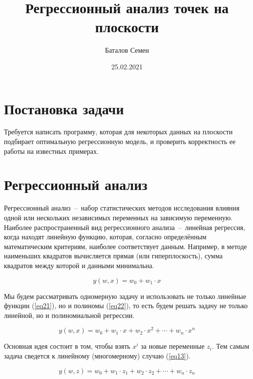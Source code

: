 \documentclass[12pt, a4paper]{article}
\title{Регрессионный анализ точек на плоскости}
\author{Баталов Семен}
\date{25.02.2021}
\begin{document}
    
    \sloppy
    
    \maketitle
    
    \section{Постановка задачи}
    
    Требуется написать программу, которая для некоторых данных на плоскости 
    подбирает оптимальную регрессионную модель, и проверить корректность ее 
    работы на известных примерах.
    
    \section{Регрессионный анализ}
    
    Регрессионный анализ~--~набор статистических методов исследования 
    влияния одной или нескольких независимых переменных на зависимую 
    переменную. Наиболее распространенный вид регрессионного 
    анализа~--~линейная регрессия, когда находят линейную функцию, которая, 
    согласно определённым математическим критериям, наиболее соответствует 
    данным. Например, в методе наименьших квадратов вычисляется прямая (или 
    гиперплоскость), сумма квадратов между которой и данными минимальна.
    
    \begin{equation}
        y(w, x) = w_{0} + w_{1} \cdot x
        \label{eq21}
    \end{equation}
    
    Мы будем рассматривать одномерную задачу и использовать не только 
    линейные функции (\ref{eq21}), но и полиномы (\ref{eq22}), то есть будем 
    решать задачу не только линейной, но и полиномиальной регрессии.
    
    \begin{equation}
        y(w, x) = w_{0} + w_{1} \cdot x + w_{2} \cdot x^{2} + \cdots + w_{n} 
        \cdot x^{n}
        \label{eq22}
    \end{equation}
    
    Основная идея состоит в том, чтобы взять $x^{i}$ за новые переменные 
    $z_{i}$. Тем самым задача сведется к линейному (многомерному) случаю 
    (\ref{eq13}).
    
    \begin{equation}
        y(w, z) = w_{0} + w_{1} \cdot z_{1} + w_{2} \cdot z_{2} + \cdots + 
        w_{n} \cdot z_{n}
        \label{eq13}
    \end{equation}
    
\end{document}
